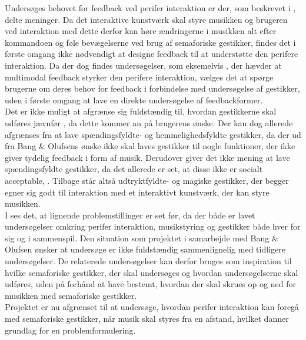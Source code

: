 Undersøges behovet for feedback ved perifer interaktion er der, som beskrevet i , delte meninger. Da det interaktive kunstværk skal styre musikken og brugeren ved interaktion med dette derfor kan høre ændringerne i musikken alt efter kommandoen og føle bevægelserne ved brug af semaforiske gestikker, findes det i første omgang ikke nødvendigt at designe feedback til at understøtte den perifere interaktion. Da der dog findes undersøgelser, som eksemelvis \textcite[s. 21]{PDF:FacilitatingPIDesignAndEvaluation}, der hævder at multimodal feedback styrker den perifere interaktion, vælges det at spørge brugerne om deres behov for feedback i forbindelse med undersøgelse af gestikker, uden i første omgang at lave en direkte undersøgelse af feedbackformer. \\

Det er ikke muligt at afgrænse sig fuldstændig til, hvordan gestikkerne skal udføres jævnfør , da dette kommer an på brugerens ønske. Der kan dog allerede afgrænses fra at lave spændingsfyldte- og hemmelighedsfyldte gestikker, da der ud fra Bang $\&$ Olufsens ønske ikke skal laves gestikker til nogle funktioner, der ikke giver tydelig feedback i form af musik. Derudover giver det ikke mening at lave spændingsfyldte gestikker, da det allerede er set, at disse ikke er socialt acceptable, \parencite[s. 277]{PDF:WouldYouDoThat}. Tilbage står altså udtryktfyldte- og magiske gestikker, der begger egner sig godt til interaktion med et interaktivt kunstværk, der kan styre musikken. \\

I  ses det, at lignende problemstillinger er set før, da der både er lavet undersøgelser omkring perifer interaktion, musikstyring og gestikker både hver for sig og i sammenspil. Den situation som projektet i samarbejde med Bang $\&$ Olufsen ønsker at undersøge er ikke fuldstændig sammenlignelig med tidligere undersøgelser. De relaterede undersøgelser kan derfor bruges som inspiration til hvilke semaforiske gestikker, der skal undersøges og hvordan undersøgelserne skal udføres, uden på forhånd at have bestemt, hvordan der skal skrues op og ned for musikken med semaforiske gestikker. \\

Projektet er nu afgrænset til at undersøge, hvordan perifer interaktion kan foregå med semaforiske gestikker, når musik skal styres fra en afstand, hvilket danner grundlag for en problemformulering.
